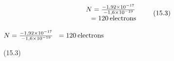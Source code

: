 {\begin{mdframed}[linewidth=4, leftmargin=40, rightmargin=40]
\begin{exercise}
\begin{enumerate}[noitemsep, label=\textbf{Step} \textbf{\arabic*}. ]
{\begin{equation}
    \begin{array}{ccc}N=\frac{-1,92\ensuremath{\times}{10}^{-17}}{-1,6\ensuremath{\times}{10}^{-19}}\\ \phantom{x}=120\phantom{\rule{2pt}{0ex}}\mathrm{electrons}\end{array}\tag{15.3}
      \end{equation}
    }{%
    \setlength{\mymathboxwidth}{\columnwidth}
      \addtolength{\mymathboxwidth}{-48pt}
    \par\vspace{12pt}\noindent\begin{minipage}{\columnwidth}
    \parbox[t]{\mymathboxwidth}{\large\begin{math}
    N=\frac{-1,92\ensuremath{\times}{10}^{-17}}{-1,6\ensuremath{\times}{10}^{-19}}\phantom{x}=120\phantom{\rule{2pt}{0ex}}\mathrm{electrons}\end{math}}\hfill
    \parbox[t]{48pt}{\raggedleft 
    (15.3)}
    \end{minipage}\vspace{12pt}\par
    }%
    \end{enumerate}
        


    \end{exercise}
    \end{mdframed}
    }
    \noindent
  \par
            \label{m38781*eip-409}\vspace{3.5cm} 
      \vspace{\rubberspace} 
